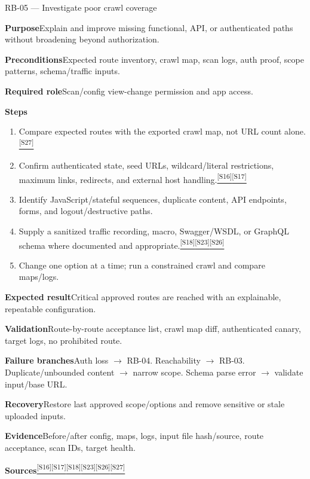\documentclass[11pt,letterpaper,oneside]{scrreprt}
\newcommand{\src}[1]{\hyperref[src:#1]{\textsuperscript{\color{R7Orange}[#1]}}}
\newcommand{\field}[1]{\par\smallskip\noindent\textbf{#1}\quad}
\begin{document}
\begin{procedure}{RB-05 --- Investigate poor crawl coverage}
\field{Purpose}Explain and improve missing functional, API, or authenticated paths without broadening beyond authorization.
\field{Preconditions}Expected route inventory, crawl map, scan logs, auth proof, scope patterns, schema/traffic inputs.
\field{Required role}Scan/config view-change permission and app access.
\field{Steps}
\begin{enumerate}
  \item Compare expected routes with the exported crawl map, not URL count alone.\src{S27}
  \item Confirm authenticated state, seed URLs, wildcard/literal restrictions, maximum links, redirects, and external host handling.\src{S16}\src{S17}
  \item Identify JavaScript/stateful sequences, duplicate content, API endpoints, forms, and logout/destructive paths.
  \item Supply a sanitized traffic recording, macro, Swagger/WSDL, or GraphQL schema where documented and appropriate.\src{S18}\src{S23}\src{S26}
  \item Change one option at a time; run a constrained crawl and compare maps/logs.
\end{enumerate}
\field{Expected result}Critical approved routes are reached with an explainable, repeatable configuration.
\field{Validation}Route-by-route acceptance list, crawl map diff, authenticated canary, target logs, no prohibited route.
\field{Failure branches}Auth loss $\rightarrow$ RB-04. Reachability $\rightarrow$ RB-03. Duplicate/unbounded content $\rightarrow$ narrow scope. Schema parse error $\rightarrow$ validate input/base URL.
\field{Recovery}Restore last approved scope/options and remove sensitive or stale uploaded inputs.
\field{Evidence}Before/after config, maps, logs, input file hash/source, route acceptance, scan IDs, target health.
\field{Sources}\src{S16}\src{S17}\src{S18}\src{S23}\src{S26}\src{S27}
\end{procedure}
\end{document}
